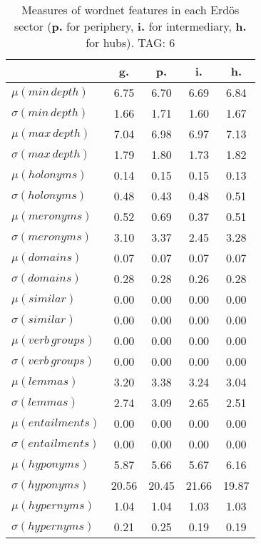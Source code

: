 \begin{table}[h!]
\begin{center}
\begin{tabular}{| l | c | c | c | c |}\hline
 & g. & p. & i. & h. \\\hline
$\mu(min\,depth)$ & 6.75  & 6.70  & 6.69  & 6.84 \\\hline
$\sigma(min\,depth)$ & 1.66  & 1.71  & 1.60  & 1.67 \\\hline
$\mu(max\,depth)$ & 7.04  & 6.98  & 6.97  & 7.13 \\\hline
$\sigma(max\,depth)$ & 1.79  & 1.80  & 1.73  & 1.82 \\\hline
$\mu(holonyms)$ & 0.14  & 0.15  & 0.15  & 0.13 \\\hline
$\sigma(holonyms)$ & 0.48  & 0.43  & 0.48  & 0.51 \\\hline
$\mu(meronyms)$ & 0.52  & 0.69  & 0.37  & 0.51 \\\hline
$\sigma(meronyms)$ & 3.10  & 3.37  & 2.45  & 3.28 \\\hline
$\mu(domains)$ & 0.07  & 0.07  & 0.07  & 0.07 \\\hline
$\sigma(domains)$ & 0.28  & 0.28  & 0.26  & 0.28 \\\hline
$\mu(similar)$ & 0.00  & 0.00  & 0.00  & 0.00 \\\hline
$\sigma(similar)$ & 0.00  & 0.00  & 0.00  & 0.00 \\\hline
$\mu(verb\,groups)$ & 0.00  & 0.00  & 0.00  & 0.00 \\\hline
$\sigma(verb\,groups)$ & 0.00  & 0.00  & 0.00  & 0.00 \\\hline
$\mu(lemmas)$ & 3.20  & 3.38  & 3.24  & 3.04 \\\hline
$\sigma(lemmas)$ & 2.74  & 3.09  & 2.65  & 2.51 \\\hline
$\mu(entailments)$ & 0.00  & 0.00  & 0.00  & 0.00 \\\hline
$\sigma(entailments)$ & 0.00  & 0.00  & 0.00  & 0.00 \\\hline
$\mu(hyponyms)$ & 5.87  & 5.66  & 5.67  & 6.16 \\\hline
$\sigma(hyponyms)$ & 20.56  & 20.45  & 21.66  & 19.87 \\\hline
$\mu(hypernyms)$ & 1.04  & 1.04  & 1.03  & 1.03 \\\hline
$\sigma(hypernyms)$ & 0.21  & 0.25  & 0.19  & 0.19 \\\hline
\end{tabular}
\caption{Measures of wordnet features in each Erd\"os sector ({{\bf p.}} for periphery, {{\bf i.}} for intermediary, {{\bf h.}} for hubs). TAG: 6}
\end{center}
\end{table}